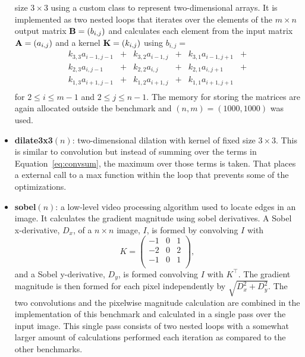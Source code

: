 \documentclass[preprint]{sigplanconf}
\begin{document}
\begin{itemize}
  size $3 \times 3$ using a custom class to represent two-dimensional
  arrays. It is implemented as two nested loops that iterates over the elements of the 
$m\times n$ output matrix ${\bf B} = \left(b_{i,j}\right)$ and calculates each element from the input matrix
${\bf A} = \left(a_{i,j}\right)$ and a kernel ${\bf K} = \left(k_{i,j}\right)$ using $b_{i,j} = $
\begin{equation}
  \label{eq:convsum}
  \begin{array}{lclclc}
    k_{3,3} a_{i-1,j-1} &+& k_{3,2} a_{i-1,j} &+& k_{3,1} a_{i-1,j+1} & + \\
    k_{2,3} a_{i,j-1}   &+& k_{2,2} a_{i,j}   &+& k_{2,1} a_{i,j+1}   & + \\
    k_{1,3} a_{i+1,j-1} &+& k_{1,2} a_{i+1,j} &+& k_{1,1} a_{i+1,j+1}  \\
  \end{array}
\end{equation}
for $2 \leq i \leq m-1$ and $2 \leq j \leq n-1$.
The memory for storing the matrices are again allocated outside the benchmark and $(n,m)=(1000,1000)$ 
 was used.
\item {\bf dilate3x3}$\left(n\right)$: two-dimensional dilation with kernel of fixed
  size $3 \times 3$. This is similar to convolution but instead of
  summing over the terms in Equation~\ref{eq:convsum}, the maximum over those terms is taken. That places a
  external call to a max function within the loop that prevents some
  of the optimizations.
\item {\bf sobel}$\left(n\right)$: a low-level video processing algorithm used to
  locate edges in an image. It calculates the gradient magnitude
  using sobel derivatives. A Sobel x-derivative, $D_x$, of a $n \times n$ image, ${I}$, is formed
by convolving ${I}$ with
\begin{equation}
  {K} = \left(
  \begin{array}{ccc}
    -1 & 0 & 1 \\
    -2 & 0 & 2 \\
    -1 & 0 & 1 \\
  \end{array}
  \right) ,
\end{equation}
and a Sobel y-derivative, $D_y$, is formed convolving $I$ with $K^\top$. The gradient magnitude is 
then formed for each pixel independently by $\sqrt{D_x^2 + D_y^2}$. The two convolutions and the pixelwise
magnitude calculation are combined in the implementation of this benchmark and calculated in a single pass over
the input image. This single pass consists of two nested loops with a somewhat larger amount of calculations 
performed each iteration as compared to the other benchmarks.
\end{itemize}
\end{document}
